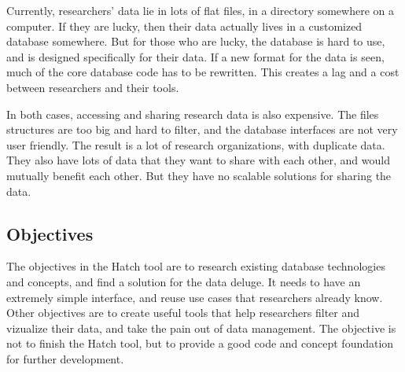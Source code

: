 Currently, researchers' data lie in lots of flat files, in a directory somewhere
on a computer. If they are lucky, then their data actually lives in a customized
database somewhere. But for those who are lucky, the database is hard to use, and 
is designed specifically for their data. If a new format for the data is seen, 
much of the core database code has to be rewritten. This creates a lag and a cost
between researchers and their tools.

In both cases, accessing and sharing research data is also expensive. The files 
structures are too big and hard to filter, and the database interfaces are not
very user friendly. The result is a lot of research organizations, with duplicate
data. They also have lots of data that they want to share with each other, and 
would mutually benefit each other. But they have no scalable solutions for 
sharing the data.

\subsection{Objectives}

The objectives in the Hatch tool are to research existing database technologies
and concepts, and find a solution for the data deluge. It needs to have an 
extremely simple interface, and reuse use cases that researchers already
know. Other objectives are to create useful tools that help researchers
filter and vizualize their data, and take the pain out of data management.
The objective is not to finish the Hatch tool, but to provide a good 
code and concept foundation for further development. 



